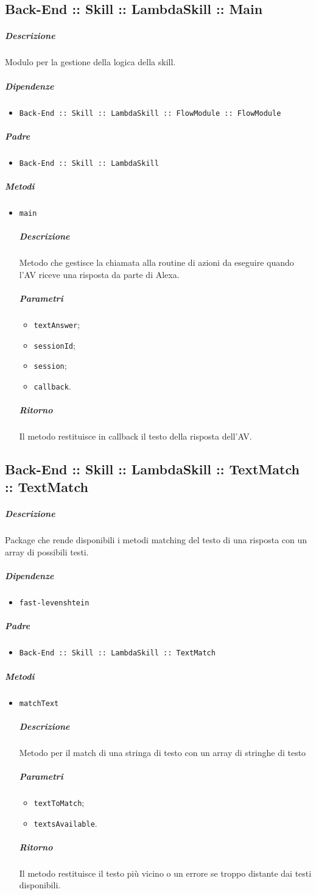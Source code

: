 \documentclass[../ManualeSviluppatore_v1.0.0.tex]{subfiles}
\begin{document}
\subsection{Back-End :: Skill :: LambdaSkill :: Main}
\subparagraph{Descrizione} Modulo per la gestione della logica della skill.
\subparagraph{Dipendenze}
\begin{itemize}
	\item \texttt{Back-End :: Skill :: LambdaSkill :: FlowModule :: FlowModule}
\end{itemize}
\subparagraph{Padre}
\begin{itemize}
	\item \texttt{Back-End :: Skill :: LambdaSkill}
\end{itemize}
\subparagraph{Metodi}
\begin{itemize}
	\item \texttt{main}
	      \subparagraph{Descrizione} Metodo che gestisce la chiamata alla routine di azioni da eseguire quando l'AV riceve una risposta da parte di Alexa.
	      \subparagraph{Parametri}
	      \begin{itemize}
	      	\item \texttt{textAnswer};
	      	\item \texttt{sessionId};
	      	\item \texttt{session};
	      	\item \texttt{callback}.
	      \end{itemize}
	      \subparagraph{Ritorno} Il metodo restituisce in callback il testo della risposta dell'AV.
\end{itemize}

\subsection{Back-End :: Skill :: LambdaSkill :: TextMatch :: TextMatch}
\subparagraph{Descrizione} Package che rende disponibili i metodi matching del testo di una risposta con un array di possibili testi.
\subparagraph{Dipendenze} 
\begin{itemize}
\item \texttt{fast-levenshtein}
\end{itemize}
\subparagraph{Padre} 
\begin{itemize}
\item \texttt{Back-End :: Skill :: LambdaSkill :: TextMatch}
\end{itemize}
\subparagraph{Metodi}
\begin{itemize}
	\item \texttt{matchText}
	      \subparagraph{Descrizione} Metodo per il match di una stringa di testo con un array di stringhe di testo
	      \subparagraph{Parametri}
	      \begin{itemize}
	      	\item \texttt{textToMatch};
	      	\item \texttt{textsAvailable}.
	      \end{itemize}
	      \subparagraph{Ritorno} Il metodo restituisce il testo più vicino o un errore se troppo distante dai testi disponibili.
\end{itemize}
\end{document}
